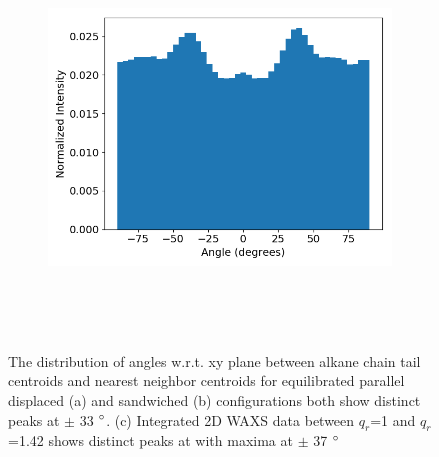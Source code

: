 \documentclass{article}
\begin{document}
\begin{figure}[ht]
\begin{subfigure}{0.3\linewidth}
	\includegraphics[width=\linewidth]{integrated_WAXS_ring.png}
	\caption{}~\label{fig:rz_layered}
\end{subfigure}
\caption{The distribution of angles w.r.t. xy plane between alkane chain tail centroids and nearest 
neighbor centroids for equilibrated parallel displaced (a) and sandwiched (b) configurations both show 
distinct peaks at $\pm$ 33 $\degree$. (c) Integrated 2D WAXS data between $q_r$=1 and $q_r$=1.42 shows
distinct peaks at with maxima at $\pm$ 37 $\degree$}~\label{fig:tail_packing}
\end{figure}
\end{document}
